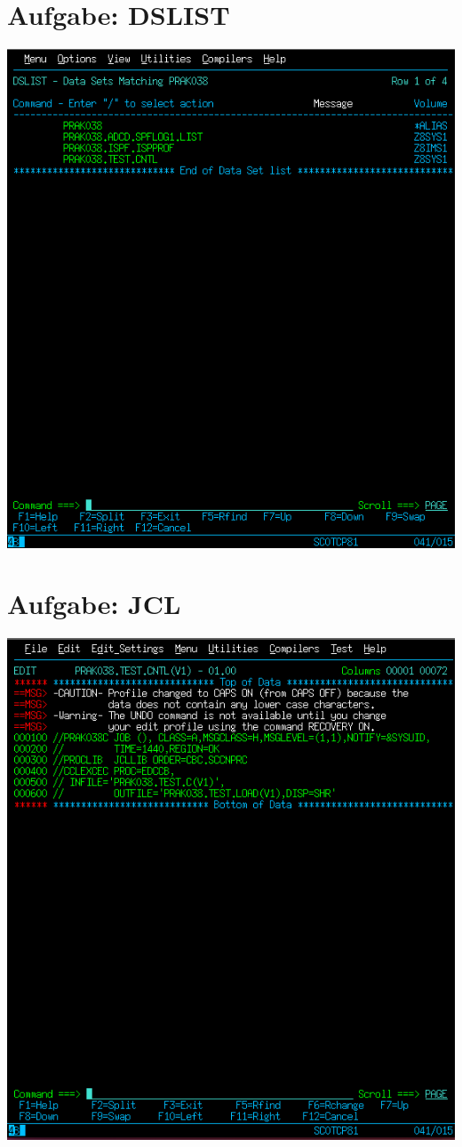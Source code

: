 \documentclass[a4paper]{scrartcl}
\begin{document}
	\section{Aufgabe: DSLIST}
	\includegraphics{screenshots/1_DSLIST.png}
	\section{Aufgabe: JCL}
	\includegraphics{screenshots/2_JCL.png}
\end{document}
